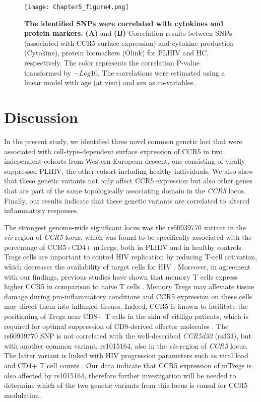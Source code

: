 \documentclass{book}
\begin{document}
\begin{refsection}
\begin{figure} %
  \centering
  \texttt{[image: Chapter5\_figure4.png]}
  \caption{\label{fig:chp5fig4} \textbf{The identified SNPs were correlated with cytokines and protein markers.}
  \textbf{(A)} and \textbf{(B)} Correlation results between SNPs (associated with CCR5 surface expression) and cytokine production (Cytokine), protein biomarkers (Olink) for PLHIV and HC, respectively.
    The color represents the correlation P-value transformed by $-Log10$.
    The correlations were estimated using a linear model with age (at visit) and sex as co-variables.
  }
\end{figure}

\section*{Discussion}
In the present study, we identified three novel common genetic loci that were associated with cell-type-dependent surface expression of CCR5 in two independent cohorts from Western European descent, one consisting of virally suppressed PLHIV, the other cohort including healthy individuals.
We also show that these genetic variants not only affect CCR5 expression but also other genes that are part of the same topologically associating domain in the \textit{CCR5} locus.
Finally, our results indicate that these genetic variants are correlated to altered inflammatory responses. 

The strongest genome-wide significant locus was the rs60939770 variant in the \textit{cis}-region of \textit{CCR5} locus, which was found to be specifically associated with the percentage of CCR5+CD4+ mTregs, both in PLHIV and in healthy controls.
Tregs cells are important to control HIV replication by reducing T-cell activation, which decreases the availability of target cells for HIV \cite{Nilsson2006HIV}.
Moreover, in agreement with our findings, previous studies have shown that memory T cells express higher CCR5 in comparison to naive T cells \cite{Lee1999Quantification}.
Memory Tregs may alleviate tissue damage during pro-inflammatory conditions and CCR5 expression on these cells may direct them into inflamed tissues.
Indeed, CCR5 is known to facilitate the positioning of Tregs near CD8+ T cells in the skin of vitiligo patients, which is required for optimal suppression of CD8-derived effector molecules \cite{Gellatly2021scRNA}.
The rs60939770 SNP is not correlated with the well-described \textit{CCR5d32} (rs333), but with another common variant, rs1015164, also in the \textit{cis}-region of \textit{CCR5} locus.
The latter variant is linked with HIV progression parameters such as viral load and CD4+ T cell counts \cite{Kulkarni2019CCR5AS,McLaren2015Polymorphisms}.
Our data indicate that CCR5 expression of mTregs is also affected by rs1015164, therefore further investigation will be needed to determine which of the two genetic variants from this locus is causal for CCR5 modulation.  


\end{refsection}
\end{document}
